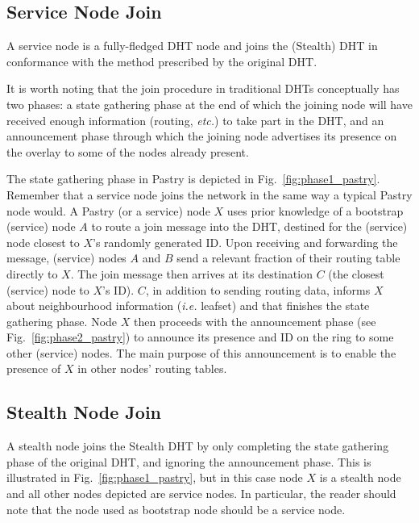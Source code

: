 \documentclass[letterpaper]{sig-alternate} %
\begin{document}
\subsection{Service Node Join}
\label{subsect-join:service}

A service node is a fully-fledged DHT node and joins the (Stealth)
DHT in conformance with the method prescribed by the original DHT.

It is worth noting that the join procedure in traditional DHTs conceptually has
two phases: a state gathering phase at the end of which the joining node will
have received enough information (routing, \emph{etc.}) to take part in the
DHT, and an announcement phase through which the joining node advertises its
presence on the overlay to some of the nodes already present.

The state gathering phase in Pastry is depicted in
Fig.~\ref{fig:phase1_pastry}. Remember that a service node joins the network in
the same way a typical Pastry node would. A Pastry (or a service) node $X$ uses
prior knowledge of a bootstrap (service) node $A$ to route a join message into
the DHT, destined for the (service) node closest to $X$'s randomly generated
ID. Upon receiving and forwarding the message, (service) nodes $A$ and $B$ send
a relevant fraction of their routing table directly to $X$. The join message
then arrives at its destination $C$ (the closest (service) node to $X$'s ID).
$C$, in addition to sending routing data, informs $X$ about neighbourhood
information (\emph{i.e.} leafset) and that finishes the state gathering phase.
Node $X$ then proceeds with the announcement phase (see
Fig.~\ref{fig:phase2_pastry}) to announce its presence and ID on the ring to
some other (service) nodes. The main purpose of this announcement is to enable
the presence of $X$ in other nodes' routing tables.

\subsection{Stealth Node Join}
\label{subsect-join:stealth}

A stealth node joins the Stealth DHT by only completing the state gathering
phase of the original DHT, and ignoring the announcement phase. This is
illustrated in Fig.~\ref{fig:phase1_pastry}, but in this case node $X$ is a
stealth node and all other nodes depicted are service nodes. In particular, the
reader should note that the node used as bootstrap node should be a service
node.
\end{document}
